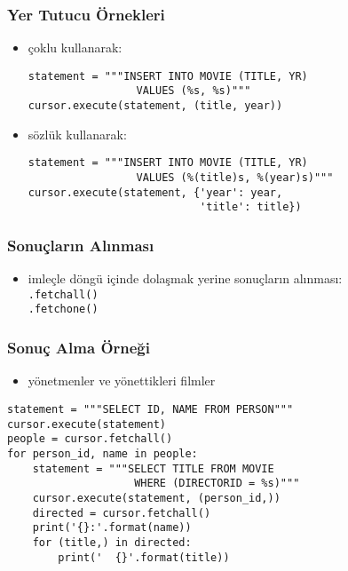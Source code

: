 \documentclass[dvipsnames]{beamer}
\theoremstyle{plain}
\begin{document}
\begin{frame}[fragile]
  \frametitle{Yer Tutucu Örnekleri}

  \begin{itemize}
    \item çoklu kullanarak:
    \begin{lstlisting}
statement = """INSERT INTO MOVIE (TITLE, YR)
                 VALUES (%s, %s)"""
cursor.execute(statement, (title, year))
    \end{lstlisting}

    \pause
    \item sözlük kullanarak:
    \begin{lstlisting}
statement = """INSERT INTO MOVIE (TITLE, YR)
                 VALUES (%(title)s, %(year)s)"""
cursor.execute(statement, {'year': year,
                           'title': title})
    \end{lstlisting}
  \end{itemize}
\end{frame}

\begin{frame}[fragile]
  \frametitle{Sonuçların Alınması}

  \begin{itemize}
    \item imleçle döngü içinde dolaşmak yerine sonuçların alınması:\\
      \lstinline!.fetchall()!\\
      \lstinline!.fetchone()!
  \end{itemize}
\end{frame}

\begin{frame}[fragile]
  \frametitle{Sonuç Alma Örneği}

  \begin{itemize}
    \item yönetmenler ve yönettikleri filmler
  \end{itemize}

  \begin{lstlisting}
statement = """SELECT ID, NAME FROM PERSON"""
cursor.execute(statement)
people = cursor.fetchall()
for person_id, name in people:
    statement = """SELECT TITLE FROM MOVIE
                    WHERE (DIRECTORID = %s)"""
    cursor.execute(statement, (person_id,))
    directed = cursor.fetchall()
    print('{}:'.format(name))
    for (title,) in directed:
        print('  {}'.format(title))
  \end{lstlisting}
\end{frame}
\end{document}
